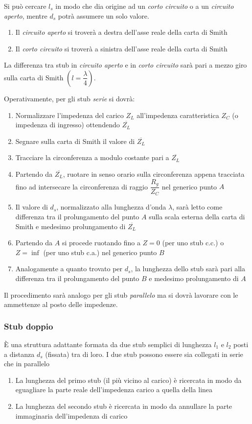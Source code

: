 \documentclass{article}
\begin{document}
Si può cercare \(l_s\) in modo che dia origine ad un \textit{corto circuito} o a un \textit{circuito aperto}, mentre \(d_s\) potrà assumere un solo valore.
\begin{enumerate}
	\item Il \textit{circuito aperto} si troverà a destra dell'asse reale della carta di Smith
	\item Il \textit{corto circuito} si troverà a sinistra dell'asse reale della carta di Smith
\end{enumerate}
La differenza tra stub in \textit{circuito aperto} e in \textit{corto circuito} sarà pari a mezzo giro sulla carta di Smith \(( l = \dfrac{\lambda}{4} )\). 

Operativamente, per gli stub \textit{serie} si dovrà:
\begin{enumerate}
	\item Normalizzare l'impedenza del carico \(Z_L\) all'impedenza caratteristica \(Z_C\) (o impedenza di ingresso) ottendendo \(\overline{Z_L}\)
	\item Segnare sulla carta di Smith il valore di \( \overline{Z_L} \)
	\item Tracciare la circonferenza a modulo costante pari a \( \overline{Z_L} \)
	\item Partendo da \(\overline{Z_L}\), ruotare in senso orario sulla circonferenza appena tracciata fino ad intersecare la circonferenza di raggio \(\dfrac{R_g}{Z_C}\) nel generico punto \(A\)
	\item Il valore di \( d_s \), normalizzato alla lunghezza d'onda \( \lambda \), sarà letto come differenza tra il prolungamento del punto \(A\) sulla scala esterna della carta di Smith e medesimo prolungamento di \(\overline{Z_L}\)
	\item Partendo da \(A\) si procede ruotando fino a \(Z = 0\) (per uno stub c.c.) o \( Z = \inf \) (per uno stub c.a.) nel generico punto \(B\)
	\item Analogamente a quanto trovato per \( d_s \), la lunghezza dello stub sarà pari alla differenza tra il prolungamento del punto \(B\) e medesimo prolungamento di \(A\)  
\end{enumerate}
Il procedimento sarà analogo per gli stub \textit{parallelo} ma si dovrà lavorare con le ammettenze al posto delle impedenze.

\subsubsection{Stub doppio}
\`E una struttura adattante formata da due stub semplici di lunghezza \(l_1\) e \(l_2\) posti a distanza \(d_s\) (fissata) tra di loro. I due stub possono essere sia collegati in serie che in parallelo
\begin{enumerate}
	\item La lunghezza del primo stub (il più vicino al carico) è ricercata in modo da eguagliare la parte reale dell'impedenza carico a quella della linea
	\item La lunghezza del secondo stub è ricercata in modo da annullare la parte immaginaria dell'impedenza di carico
\end{enumerate}
\end{document}
